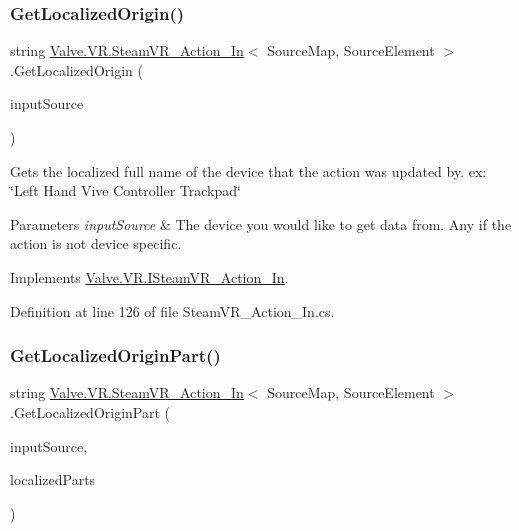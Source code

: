 \subsubsection{\texorpdfstring{GetLocalizedOrigin()}{GetLocalizedOrigin()}}
{\footnotesize\ttfamily string \mbox{\hyperlink{class_valve_1_1_v_r_1_1_steam_v_r___action___in}{Valve.\+V\+R.\+Steam\+V\+R\+\_\+\+Action\+\_\+\+In}}$<$ Source\+Map, Source\+Element $>$.Get\+Localized\+Origin (\begin{DoxyParamCaption}\item[{\mbox{\hyperlink{namespace_valve_1_1_v_r_a82e5bf501cc3aa155444ee3f0662853f}{Steam\+V\+R\+\_\+\+Input\+\_\+\+Sources}}}]{input\+Source }\end{DoxyParamCaption})}



Gets the localized full name of the device that the action was updated by. ex\+: \char`\"{}\+Left Hand Vive Controller Trackpad\char`\"{} 


\begin{DoxyParams}{Parameters}
{\em input\+Source} & The device you would like to get data from. Any if the action is not device specific.\\
\hline
\end{DoxyParams}


Implements \mbox{\hyperlink{interface_valve_1_1_v_r_1_1_i_steam_v_r___action___in_a13a0e2e6f5ceb7ea67542364e203b383}{Valve.\+V\+R.\+I\+Steam\+V\+R\+\_\+\+Action\+\_\+\+In}}.



Definition at line 126 of file Steam\+V\+R\+\_\+\+Action\+\_\+\+In.\+cs.

\mbox{\label{class_valve_1_1_v_r_1_1_steam_v_r___action___in_a6ae3b2c4b90917042b1fda3fe54b2d36}} 
\subsubsection{\texorpdfstring{GetLocalizedOriginPart()}{GetLocalizedOriginPart()}}
{\footnotesize\ttfamily string \mbox{\hyperlink{class_valve_1_1_v_r_1_1_steam_v_r___action___in}{Valve.\+V\+R.\+Steam\+V\+R\+\_\+\+Action\+\_\+\+In}}$<$ Source\+Map, Source\+Element $>$.Get\+Localized\+Origin\+Part (\begin{DoxyParamCaption}\item[{\mbox{\hyperlink{namespace_valve_1_1_v_r_a82e5bf501cc3aa155444ee3f0662853f}{Steam\+V\+R\+\_\+\+Input\+\_\+\+Sources}}}]{input\+Source,  }\item[{params \mbox{\hyperlink{namespace_valve_1_1_v_r_a05e76187bbc5846b9bfb44f6acf13912}{E\+V\+R\+Input\+String\+Bits}} \mbox{[}$\,$\mbox{]}}]{localized\+Parts }\end{DoxyParamCaption})}



